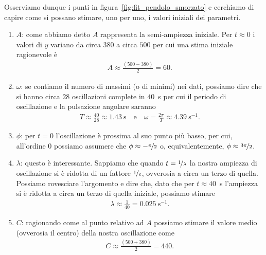 Osserviamo dunque i punti in figura~\ref{fig:fit_pendolo_smorzato} e
cerchiamo di capire come si possano stimare, uno per uno, i valori iniziali
dei parametri.
\begin{enumerate}
\item $A$: come abbiamo detto $A$ rappresenta la semi-ampiezza iniziale.
  Per $t \approx 0$ i valori di $y$ variano da circa $380$ a circa $500$
  per cui una stima iniziale ragionevole è
  \begin{align*}
    A \approx \frac{(500 - 380)}{2} = 60.
  \end{align*}
\item $\omega$: se contiamo il numero di massimi (o di minimi) nei dati,
  possiamo dire che si hanno circa $28$ oscillazioni complete in $40$~s
  per cui il periodo di oscillazione e la pulsazione angolare saranno
  \begin{align*}
    T \approx \frac{40}{28} \approx 1.43~\text{s}
    \quad \text{e} \quad
    \omega = \frac{2\pi}{T} \approx 4.39~\text{s}^{-1}.
  \end{align*}
\item $\phi$: per $t = 0$ l'oscillazione è prossima al suo punto più basso,
  per cui, all'ordine $0$ possiamo assumere che
  $\phi \approx -\nicefrac{\pi}{2}$ o, equivalentemente,
  $\phi \approx \nicefrac{3\pi}{2}$.
\item $\lambda$: questo è interessante. Sappiamo che quando
  $t = \nicefrac{1}{\lambda}$ la nostra ampiezza di oscillazione si è ridotta
  di un fattore $\nicefrac{1}{e}$, ovverosia a circa un terzo di quella.
  Possiamo rovesciare l'argomento e dire che, dato che per $t \approx 40$~s
  l'ampiezza si è ridotta a circa un terzo di quella iniziale, possiamo
  stimare
  \begin{align*}
    \lambda \approx \frac{1}{40} = 0.025~\text{s}^{-1}.
  \end{align*}
\item $C$: ragionando come al punto relativo ad $A$ possiamo stimare il
  valore medio (ovverosia il centro) della nostra oscillazione come
  \begin{align*}
    C \approx \frac{(500 + 380)}{2} = 440.
  \end{align*}
\end{enumerate}

